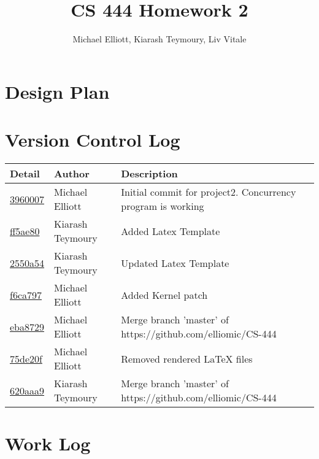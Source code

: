 \documentclass[letterpaper,10pt,titlepage,draftclsnofoot,onecolumn]{IEEEtran}
\title{CS 444 Homework 2}
\author{Michael Elliott, Kiarash Teymoury, Liv Vitale}
\begin{document}
\section{Design Plan}


\section{Version Control Log}

\begin{tabular}{l l l}\textbf{Detail} & \textbf{Author} & \textbf{Description}\\\hline
\href{https://github.com/elliomic/CS-444/commit/3960007dcd2e09104c3b8163b326ba635a00fe25}{3960007} & Michael Elliott & Initial commit for project2. Concurrency program is working\\\hline
\href{https://github.com/elliomic/CS-444/commit/ff5ae8022f9a2cb63b4174945bec1f7ec3d67d77}{ff5ae80} & Kiarash Teymoury & Added Latex Template\\\hline
\href{https://github.com/elliomic/CS-444/commit/2550a5434d0e99148462ae4c27ee47d6649e1f84}{2550a54} & Kiarash Teymoury & Updated Latex Template\\\hline
\href{https://github.com/elliomic/CS-444/commit/f6ca797f7076ba4a3f300e6e777f1ff3dd782a0b}{f6ca797} & Michael Elliott & Added Kernel patch\\\hline
\href{https://github.com/elliomic/CS-444/commit/eba8729a916481d064ded4e5d0a9bc6aca866996}{eba8729} & Michael Elliott & Merge branch 'master' of https://github.com/elliomic/CS-444\\\hline
\href{https://github.com/elliomic/CS-444/commit/75de20f36af8f4e47207e25020e866469c3df88a}{75de20f} & Michael Elliott & Removed rendered LaTeX files\\\hline
\href{https://github.com/elliomic/CS-444/commit/620aaa92bd40125290c7e8fea12d804613227c1e}{620aaa9} & Kiarash Teymoury & Merge branch 'master' of https://github.com/elliomic/CS-444\\\hline
\hline\end{tabular}


\section{Work Log}
\end{document}
